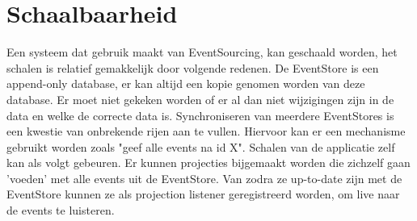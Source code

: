 
\section{Schaalbaarheid}
\label{sec:schaalbaarheid}

Een systeem dat gebruik maakt van EventSourcing, kan geschaald worden, het schalen is relatief gemakkelijk door volgende redenen.
De EventStore is een append-only database, er kan altijd een kopie genomen worden van deze database. Er moet niet gekeken worden of er al dan niet wijzigingen zijn in de data en welke de correcte data is. Synchroniseren van meerdere EventStores is een kwestie van onbrekende rijen aan te vullen. Hiervoor kan er een mechanisme gebruikt worden zoals "geef alle events na id X".
Schalen van de applicatie zelf kan als volgt gebeuren. Er kunnen projecties bijgemaakt worden die zichzelf gaan 'voeden' met alle events uit de EventStore. Van zodra ze up-to-date zijn met de EventStore kunnen ze als projection listener geregistreerd worden, om live naar de events te luisteren.